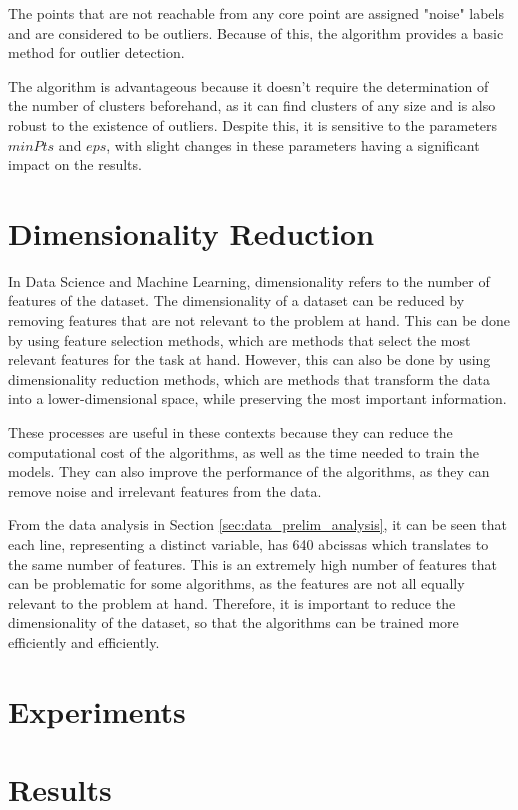 The points that are not reachable from any core point are assigned "noise" labels and are considered to be outliers. Because of this, the algorithm provides a basic method for outlier detection.

The algorithm is advantageous because it doesn't require the determination of the number of clusters beforehand, as it can find clusters of any size and is also robust to the existence of outliers. Despite this, it is sensitive to the parameters $minPts$ and $eps$, with slight changes in these parameters having a significant impact on the results.

\section{Dimensionality Reduction}\label{sec:dim_reduction}
In Data Science and Machine Learning, dimensionality refers to the number of features of the dataset. The dimensionality of a dataset can be reduced by removing features that are not relevant to the problem at hand. This can be done by using feature selection methods, which are methods that select the most relevant features for the task at hand. However, this can also be done by using dimensionality reduction methods, which are methods that transform the data into a lower-dimensional space, while preserving the most important information.

These processes are useful in these contexts because they can reduce the computational cost of the algorithms, as well as the time needed to train the models. They can also improve the performance of the algorithms, as they can remove noise and irrelevant features from the data.

From the data analysis in Section \ref{sec:data_prelim_analysis}, it can be seen that each line, representing a distinct variable, has 640 abcissas which translates to the same number of features. This is an extremely high number of features that can be problematic for some algorithms, as the features are not all equally relevant to the problem at hand. Therefore, it is important to reduce the dimensionality of the dataset, so that the algorithms can be trained more efficiently and efficiently. %

\section{Experiments}\label{sec:clustering_experiments}

\section{Results}\label{sec:clustering_results}
